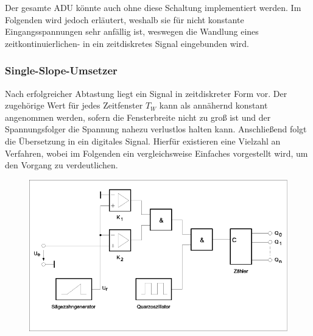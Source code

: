 Der gesamte ADU könnte auch ohne diese Schaltung implementiert werden. Im Folgenden wird jedoch erläutert, weshalb sie für nicht konstante Eingangsspannungen sehr anfällig ist, weswegen die	Wandlung eines zeitkontinuierlichen- in ein zeitdiskretes Signal eingebunden wird.

\subsubsection{Single-Slope-Umsetzer}

Nach erfolgreicher Abtastung liegt ein Signal in zeitdiskreter Form vor. Der zugehörige Wert für jedes Zeitfenster $T_W$ kann als annähernd konstant angenommen werden, sofern die Fensterbreite nicht zu groß ist und der Spannungsfolger die Spannung nahezu verlustlos halten kann. Anschließend folgt die Übersetzung in ein digitales Signal. Hierfür existieren eine Vielzahl an Verfahren, wobei im Folgenden ein vergleichsweise Einfaches vorgestellt wird, um den Vorgang zu verdeutlichen.

\begin{figure}[h!]
\centering
\includegraphics[scale=0.4]{images/singleslope.png}
\label{singleslope_schaltung}
\end{figure}

